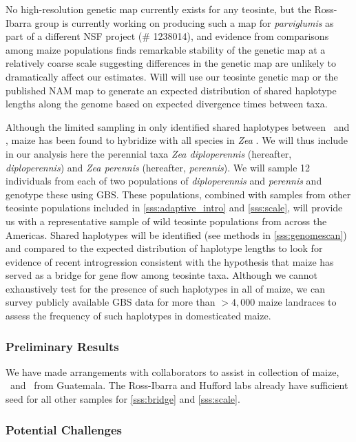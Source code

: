 No high-resolution genetic map currently exists for any teosinte, but the Ross-Ibarra group is currently working on producing such a map for \emph{parviglumis} as part of a different NSF project (\# 1238014), and evidence from comparisons among maize populations finds remarkable stability of the genetic map at a relatively coarse scale \citep{bauer2013} suggesting differences in the genetic map are unlikely to dramatically affect our estimates. 
Will will use our teosinte genetic map or the published NAM map \citep{McMullen2009} to generate an expected distribution of shared haplotype lengths along the genome based on expected divergence times between taxa.

Although the limited sampling in \citet{Ross-Ibarra2009a} only identified shared haplotypes between \zm\ and \zl, maize has been found to hybridize with all species in \emph{Zea} \citep{Wilkes1977}.
We will thus include in our analysis here the perennial taxa \emph{Zea diploperennis} (hereafter, \emph{diploperennis}) and \emph{Zea perennis} (hereafter, \emph{perennis}).  
We will sample 12 individuals from each of two populations of \emph{diploperennis} and \emph{perennis} and genotype these using GBS.
These populations, combined with samples from other teosinte populations included in \ref{sss:adaptive_intro} and \ref{sss:scale}, will provide us with a representative sample of wild teosinte populations from across the Americas.
Shared haplotypes will be identified (see methods in \ref{sss:genomescan}) and compared to the expected distribution of haplotype lengths to look for evidence of recent introgression consistent with the hypothesis that maize has served as a bridge for gene flow among teosinte taxa.
Although we cannot exhaustively test for the presence of such haplotypes in all of maize, we can survey publicly available GBS data for more than $>4,000$ maize landraces \citep{Hearne2015} to assess the frequency of such haplotypes in domesticated maize.

\subsubsection{Preliminary Results}
We have made arrangements with collaborators to assist in collection of maize, \zl\ and \zh\ from Guatemala.  The Ross-Ibarra and Hufford labs already have sufficient seed for all other samples for \ref{sss:bridge} and \ref{sss:scale}.

\subsubsection{Potential Challenges}


